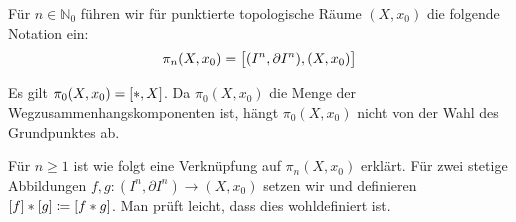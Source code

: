 \begin{definition}[{name=[Homotopiegruppe]}]
	Für $n \in \mathbb{N}_0$ führen wir für punktierte topologische Räume $(X,x_0)$ die folgende Notation ein:
	\[
		\pi_n(X,x_0) = \benbrace[\big]{(I^n,\partial I^n),(X,x_0)}
	\]
\end{definition}

\begin{bemerkung}[{name=[Menge der Wegzusammenhangskomponenten]}]
	Es gilt $\pi_0(X,x_0) = \benbrace*{*,X}$.
	Da $\pi_0(X,x_0)$ die Menge der Wegzusammenhangskomponenten ist, hängt $\pi_0(X,x_0)$ nicht von der Wahl des Grundpunktes ab.
\end{bemerkung}

Für $n\ge 1$ ist wie folgt eine Verknüpfung auf $\pi_n(X,x_0)$ erklärt.
Für zwei stetige Abbildungen $f,g \colon (I^n,\partial I^n) \to (X,x_0)$ setzen wir 
und definieren $\benbrace*{f} * \benbrace*{g} \coloneqq \benbrace*{f * g}$.
Man prüft leicht, dass dies wohldefiniert ist.

